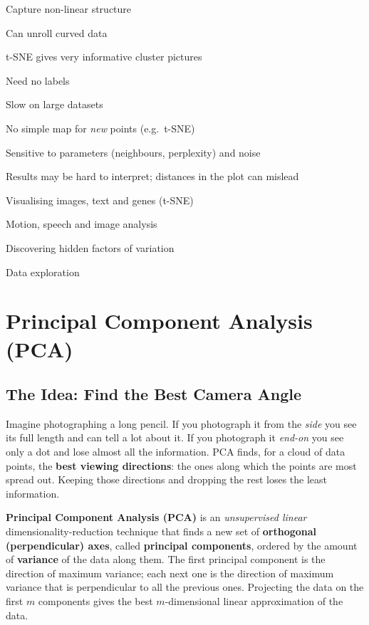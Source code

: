 {\item Capture non-linear structure
 \item Can unroll curved data
 \item t-SNE gives very informative cluster pictures
 \item Need no labels}
{\item Slow on large datasets
 \item No simple map for \emph{new} points (e.g.\ t-SNE)
 \item Sensitive to parameters (neighbours, perplexity) and noise
 \item Results may be hard to interpret; distances in the plot can mislead}
{\item Visualising images, text and genes (t-SNE)
 \item Motion, speech and image analysis
 \item Discovering hidden factors of variation
 \item Data exploration}

\section{Principal Component Analysis (PCA)}\label{sec:pca}

\subsection{The Idea: Find the Best Camera Angle}

Imagine photographing a long pencil. If you photograph it from the \emph{side} you see its full length and can tell a lot about it. If you photograph it \emph{end-on} you see only a dot and lose almost all the information. PCA finds, for a cloud of data points, the \textbf{best viewing directions}: the ones along which the points are most spread out. Keeping those directions and dropping the rest loses the least information.

\begin{definition}
\textbf{Principal Component Analysis (PCA)} is an \emph{unsupervised linear} dimensionality-reduction technique that finds a new set of \textbf{orthogonal (perpendicular) axes}, called \textbf{principal components}, ordered by the amount of \textbf{variance} of the data along them. The first principal component is the direction of maximum variance; each next one is the direction of maximum variance that is perpendicular to all the previous ones. Projecting the data on the first $m$ components gives the best $m$-dimensional linear approximation of the data.
\end{definition}

